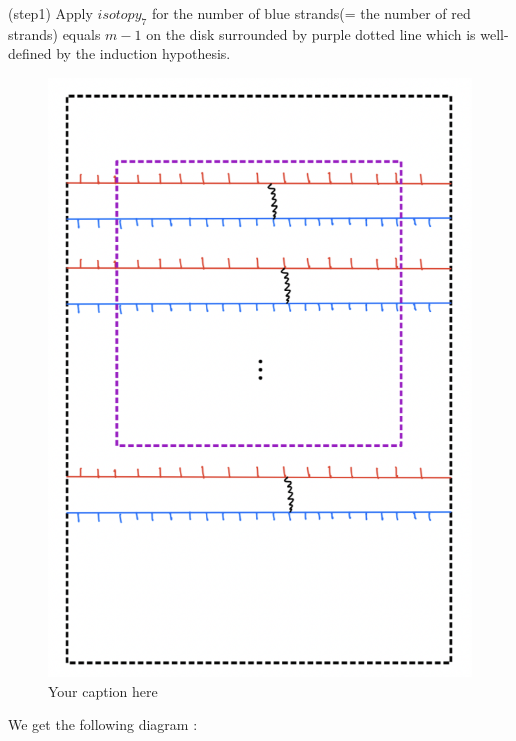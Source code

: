 (step1) Apply $isotopy_7$ for the number of blue strands(= the number of red strands) equals $m-1$ on the disk surrounded by purple dotted line which is well-defined by the induction hypothesis.

\begin{figure}[H] %
    \centering
    \includegraphics[width=\linewidth]{diagrams/lemma7/3.png} %
    \caption{Your caption here}
    \label{fig:your-label}
\end{figure}

We get the following diagram :

